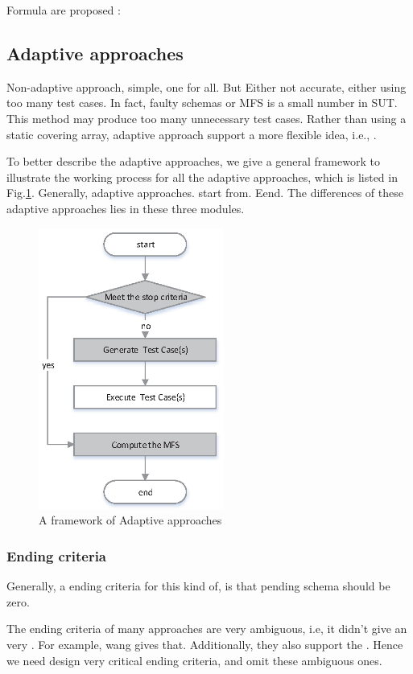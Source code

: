\documentclass[10pt,journal,cspaper,compsoc]{IEEEtran}
\begin{document}
Formula are proposed :




\subsection{Adaptive approaches}
Non-adaptive approach, simple, one for all. But Either not accurate, either using too many test cases. In fact, faulty schemas or MFS is a small number in SUT. This method may produce too many unnecessary test cases. Rather than using a static covering array, adaptive approach support a more flexible idea, i.e., .

To better describe the adaptive approaches, we give a general framework to illustrate the working process for all the adaptive approaches, which is listed in Fig.\ref{figadaptive}. Generally, adaptive approaches. start from. Eend. The differences of these adaptive approaches lies in these three modules.


\begin{figure}
 \centering
 \includegraphics[width=2.4in]{adaptive-approach.eps}
 \caption{A framework of Adaptive approaches}
 \label{figadaptive}
\end{figure}


\subsubsection{Ending criteria}

Generally, a ending criteria for this kind of, is that pending schema should be zero. 

The ending criteria of many approaches are very ambiguous, i.e, it didn't give an very . For example, wang gives that. Additionally, they also support the . Hence we need design very critical ending criteria, and omit these ambiguous ones. 
\end{document}
